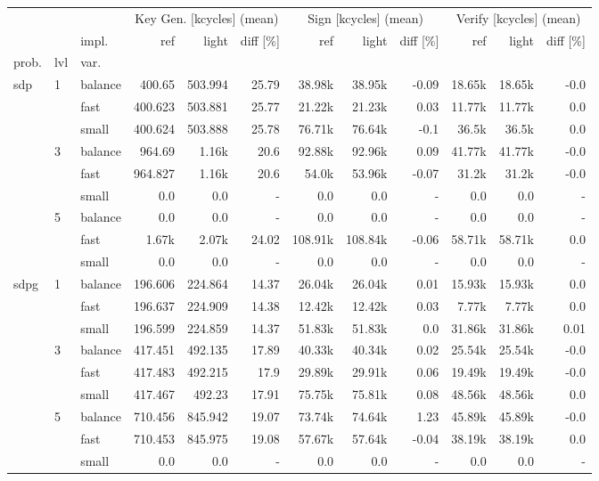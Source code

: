 \begin{tabular}{lll|r|r|r|r|r|r|r|r|r|}
\toprule
 &  &  & \multicolumn{3}{c}{Key Gen. [kcycles] (mean)} & \multicolumn{3}{c}{Sign [kcycles] (mean)} & \multicolumn{3}{c}{Verify [kcycles] (mean)} \\
 &  & impl. & ref & light & diff [\%] & ref & light & diff [\%] & ref & light & diff [\%] \\
prob. & lvl & var. &  &  &  &  &  &  &  &  &  \\
\midrule
\multirow[c]{9}{*}{sdp} & \multirow[c]{3}{*}{1} & balance & 400.65 & 503.994 & 25.79 & 38.98k & 38.95k & -0.09 & 18.65k & 18.65k & -0.0 \\
 &  & fast & 400.623 & 503.881 & 25.77 & 21.22k & 21.23k & 0.03 & 11.77k & 11.77k & 0.0 \\
 &  & small & 400.624 & 503.888 & 25.78 & 76.71k & 76.64k & -0.1 & 36.5k & 36.5k & 0.0 \\
\cline{2-12}
 & \multirow[c]{3}{*}{3} & balance & 964.69 & 1.16k & 20.6 & 92.88k & 92.96k & 0.09 & 41.77k & 41.77k & -0.0 \\
 &  & fast & 964.827 & 1.16k & 20.6 & 54.0k & 53.96k & -0.07 & 31.2k & 31.2k & -0.0 \\
 &  & small & 0.0 & 0.0 & - & 0.0 & 0.0 & - & 0.0 & 0.0 & - \\
\cline{2-12}
 & \multirow[c]{3}{*}{5} & balance & 0.0 & 0.0 & - & 0.0 & 0.0 & - & 0.0 & 0.0 & - \\
 &  & fast & 1.67k & 2.07k & 24.02 & 108.91k & 108.84k & -0.06 & 58.71k & 58.71k & 0.0 \\
 &  & small & 0.0 & 0.0 & - & 0.0 & 0.0 & - & 0.0 & 0.0 & - \\
\cline{1-12} \cline{2-12}
\multirow[c]{9}{*}{sdpg} & \multirow[c]{3}{*}{1} & balance & 196.606 & 224.864 & 14.37 & 26.04k & 26.04k & 0.01 & 15.93k & 15.93k & 0.0 \\
 &  & fast & 196.637 & 224.909 & 14.38 & 12.42k & 12.42k & 0.03 & 7.77k & 7.77k & 0.0 \\
 &  & small & 196.599 & 224.859 & 14.37 & 51.83k & 51.83k & 0.0 & 31.86k & 31.86k & 0.01 \\
\cline{2-12}
 & \multirow[c]{3}{*}{3} & balance & 417.451 & 492.135 & 17.89 & 40.33k & 40.34k & 0.02 & 25.54k & 25.54k & -0.0 \\
 &  & fast & 417.483 & 492.215 & 17.9 & 29.89k & 29.91k & 0.06 & 19.49k & 19.49k & -0.0 \\
 &  & small & 417.467 & 492.23 & 17.91 & 75.75k & 75.81k & 0.08 & 48.56k & 48.56k & 0.0 \\
\cline{2-12}
 & \multirow[c]{3}{*}{5} & balance & 710.456 & 845.942 & 19.07 & 73.74k & 74.64k & 1.23 & 45.89k & 45.89k & -0.0 \\
 &  & fast & 710.453 & 845.975 & 19.08 & 57.67k & 57.64k & -0.04 & 38.19k & 38.19k & 0.0 \\
 &  & small & 0.0 & 0.0 & - & 0.0 & 0.0 & - & 0.0 & 0.0 & - \\
\cline{1-12} \cline{2-12}
\bottomrule
\end{tabular}
